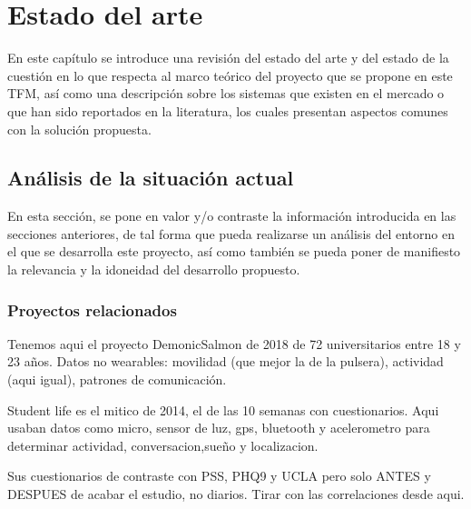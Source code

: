 \chapter{Estado del arte}
\label{chapter:estado_arte}



En este capítulo se introduce una revisión del estado del arte y del estado de la cuestión en lo que respecta al marco teórico del proyecto que se propone en este TFM, así como una descripción sobre los sistemas que existen en el mercado o que han sido reportados en la literatura, los cuales presentan aspectos comunes con la solución propuesta.


\section{Análisis de la situación actual}

En esta sección, se pone en valor y/o contraste la información introducida en las secciones anteriores, de tal forma que pueda realizarse un análisis del entorno en el que se desarrolla este proyecto, así como también se pueda poner de manifiesto la relevancia y la idoneidad del desarrollo propuesto. 



\subsection{Proyectos relacionados}

Tenemos aqui el proyecto DemonicSalmon de 2018 de 72 universitarios entre 18 y 23 años. Datos no wearables: movilidad (que mejor la de la pulsera), actividad (aqui igual), patrones de comunicación.

Student life es el mitico de 2014, el de las 10 semanas con cuestionarios. Aqui usaban datos como micro, sensor de luz, gps, bluetooth y acelerometro para determinar actividad, conversacion,sueño y localizacion.

Sus cuestionarios de contraste con PSS, PHQ9 y UCLA pero solo ANTES y DESPUES de acabar el estudio, no diarios. Tirar con las correlaciones desde aqui.

